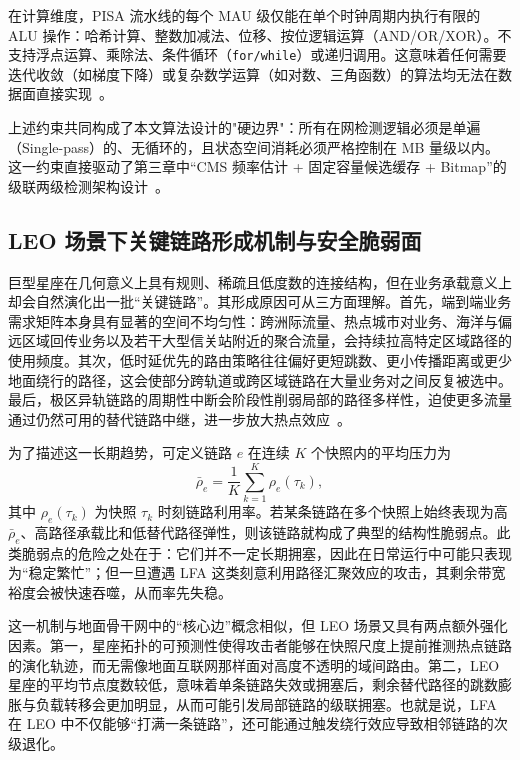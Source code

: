 在计算维度，PISA 流水线的每个 MAU 级仅能在单个时钟周期内执行有限的 ALU 操作：哈希计算、整数加减法、位移、按位逻辑运算（AND/OR/XOR）。不支持浮点运算、乘除法、条件循环（\texttt{for/while}）或递归调用。这意味着任何需要迭代收敛（如梯度下降）或复杂数学运算（如对数、三角函数）的算法均无法在数据面直接实现~\cite{bosshart2013rmt}。

上述约束共同构成了本文算法设计的"硬边界"：所有在网检测逻辑必须是单遍（Single-pass）的、无循环的，且状态空间消耗必须严格控制在 MB 量级以内。这一约束直接驱动了第三章中“CMS 频率估计 + 固定容量候选缓存 + Bitmap”的级联两级检测架构设计~\cite{satshield}。


\subsection{LEO 场景下关键链路形成机制与安全脆弱面}

巨型星座在几何意义上具有规则、稀疏且低度数的连接结构，但在业务承载意义上却会自然演化出一批“关键链路”。其形成原因可从三方面理解。首先，端到端业务需求矩阵本身具有显著的空间不均匀性：跨洲际流量、热点城市对业务、海洋与偏远区域回传业务以及若干大型信关站附近的聚合流量，会持续拉高特定区域路径的使用频度。其次，低时延优先的路由策略往往偏好更短跳数、更小传播距离或更少地面绕行的路径，这会使部分跨轨道或跨区域链路在大量业务对之间反复被选中。最后，极区异轨链路的周期性中断会阶段性削弱局部的路径多样性，迫使更多流量通过仍然可用的替代链路中继，进一步放大热点效应~\cite{handley2018delay_not_option, handley2019delay, laser_isl}。

为了描述这一长期趋势，可定义链路 $e$ 在连续 $K$ 个快照内的平均压力为
\begin{equation}
    \bar{\rho}_e=\frac{1}{K}\sum_{k=1}^{K}\rho_e(\tau_k),
\end{equation}
其中 $\rho_e(\tau_k)$ 为快照 $\tau_k$ 时刻链路利用率。若某条链路在多个快照上始终表现为高 $\bar{\rho}_e$、高路径承载比和低替代路径弹性，则该链路就构成了典型的结构性脆弱点。此类脆弱点的危险之处在于：它们并不一定长期拥塞，因此在日常运行中可能只表现为“稳定繁忙”；但一旦遭遇 LFA 这类刻意利用路径汇聚效应的攻击，其剩余带宽裕度会被快速吞噬，从而率先失稳。

这一机制与地面骨干网中的“核心边”概念相似，但 LEO 场景又具有两点额外强化因素。第一，星座拓扑的可预测性使得攻击者能够在快照尺度上提前推测热点链路的演化轨迹，而无需像地面互联网那样面对高度不透明的域间路由。第二，LEO 星座的平均节点度数较低，意味着单条链路失效或拥塞后，剩余替代路径的跳数膨胀与负载转移会更加明显，从而可能引发局部链路的级联拥塞。也就是说，LFA 在 LEO 中不仅能够“打满一条链路”，还可能通过触发绕行效应导致相邻链路的次级退化。


